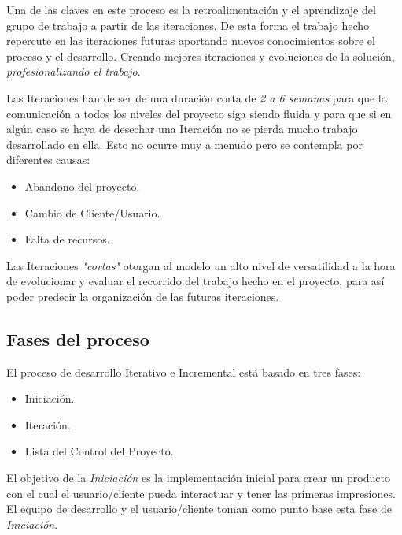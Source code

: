 \par Una de las claves en este proceso es la retroalimentación y el aprendizaje del grupo de trabajo a partir de las iteraciones. De esta forma el trabajo hecho repercute en las iteraciones futuras aportando nuevos conocimientos sobre el proceso y el desarrollo. Creando mejores iteraciones y evoluciones de la solución, \emph{profesionalizando el trabajo}.

\par Las Iteraciones han de ser de una duración corta de \emph{2 a 6 semanas} para que la comunicación a todos los niveles del proyecto siga siendo fluida y para que si en algún caso se haya de desechar una Iteración no se pierda mucho trabajo desarrollado en ella. Esto no ocurre muy a menudo pero se contempla por diferentes causas:

\begin{itemize}
	\item Abandono del proyecto.
	\item Cambio de Cliente/Usuario.
	\item Falta de recursos.
\end{itemize}

\par Las Iteraciones \emph{"cortas"} otorgan al modelo un alto nivel de versatilidad a la hora de evolucionar y evaluar el recorrido del trabajo hecho en el proyecto, para así poder predecir la organización de las futuras iteraciones.

\subsection{Fases del proceso}
\label{sub:fases-proceso}

\par El proceso de desarrollo Iterativo e Incremental está basado en tres fases:

\begin{itemize}
	\item Iniciación.
	\item Iteración.
	\item Lista del Control del Proyecto.
\end{itemize}

\par El objetivo de la \emph{Iniciación} es la implementación inicial para crear un producto con el cual el usuario/cliente pueda interactuar y tener las primeras impresiones. El equipo de desarrollo y el usuario/cliente toman como punto base esta fase de \emph{Iniciación}.

